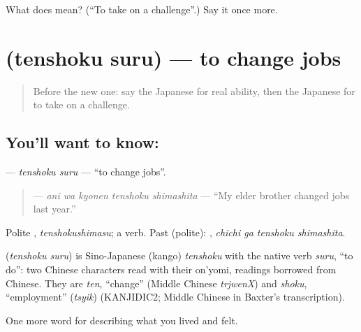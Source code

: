\begin{tcolorbox}[breakable,colback=teal!4,colframe=teal!35!black,title={Before you move on}]
What does  mean? (\textquotedblleft{}To take on a challenge\textquotedblright{}.) Say it once more.
\end{tcolorbox}
\section[\texorpdfstring{\ja{てんしょくする} (tenshoku suru)}{てんしょくする (tenshoku suru)}]{ (tenshoku suru) — to change jobs}

\label{lesson:JA-C460-tenshoku-suru}



\begin{quote}
Before the new one: say the Japanese for real ability, then the Japanese for to take on a challenge.
\end{quote}

\subsection*{You'll want to know: }
\textbf{} — \emph{tenshoku suru} — \textquotedblleft{}to change jobs\textquotedblright{}.

\begin{quote}
\textbf{  } — \emph{ani wa kyonen tenshoku shimashita} — \textquotedblleft{}My elder brother changed jobs last year.\textquotedblright{}
\end{quote}

Polite \textbf{}, \emph{tenshokushimasu}; a  verb. Past (polite): \textbf{ }, \emph{chichi ga tenshoku shimashita}.

\begin{cousinweb}
\textbf{} (\emph{tenshoku suru}) is Sino-Japanese (kango) \emph{tenshoku} with the native verb \emph{suru}, \textquotedblleft{}to do\textquotedblright{}: two Chinese characters read with their on'yomi, readings borrowed from Chinese. They are \emph{ten}, \textquotedblleft{}change\textquotedblright{} (Middle Chinese \emph{trjwenX}) and \emph{shoku}, \textquotedblleft{}employment\textquotedblright{} (\emph{tsyik}) (KANJIDIC2; Middle Chinese in Baxter's transcription).
\end{cousinweb}

\begin{grammarlens}[title={What you've built}]
One more word for describing what you lived and felt.
\end{grammarlens}

